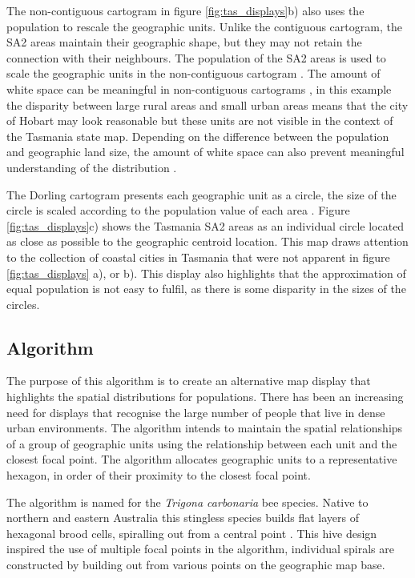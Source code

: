 The non-contiguous cartogram in figure \ref{fig:tas_displays}b) also
uses the population to rescale the geographic units. Unlike the
contiguous cartogram, the SA2 areas maintain their geographic shape, but
they may not retain the connection with their neighbours. The population
of the SA2 areas is used to scale the geographic units in the
non-contiguous cartogram \citep{NAC}. The amount of white space can be
meaningful in non-contiguous cartograms \citep{ECGC}, in this example
the disparity between large rural areas and small urban areas means that
the city of Hobart may look reasonable but these units are not visible
in the context of the Tasmania state map. Depending on the difference
between the population and geographic land size, the amount of white
space can also prevent meaningful understanding of the distribution
\citep{TVSSS}.

The Dorling cartogram presents each geographic unit as a circle, the
size of the circle is scaled according to the population value of each
area \citep{ACTUC}. Figure \ref{fig:tas_displays}c) shows the Tasmania
SA2 areas as an individual circle located as close as possible to the
geographic centroid location. This map draws attention to the collection
of coastal cities in Tasmania that were not apparent in figure
\ref{fig:tas_displays} a), or b). This display also highlights that the
approximation of equal population is not easy to fulfil, as there is
some disparity in the sizes of the circles.

\hypertarget{algorithm}{%
\subsection{Algorithm}\label{algorithm}}

The purpose of this algorithm is to create an alternative map display
that highlights the spatial distributions for populations. There has
been an increasing need for displays that recognise the large number of
people that live in dense urban environments. The algorithm intends to
maintain the spatial relationships of a group of geographic units using
the relationship between each unit and the closest focal point. The
algorithm allocates geographic units to a representative hexagon, in
order of their proximity to the closest focal point.

The algorithm is named for the \emph{Trigona carbonaria} bee species.
Native to northern and eastern Australia this stingless species builds
flat layers of hexagonal brood cells, spiralling out from a central
point \citep{PH}. This hive design inspired the use of multiple focal
points in the algorithm, individual spirals are constructed by building
out from various points on the geographic map base.

